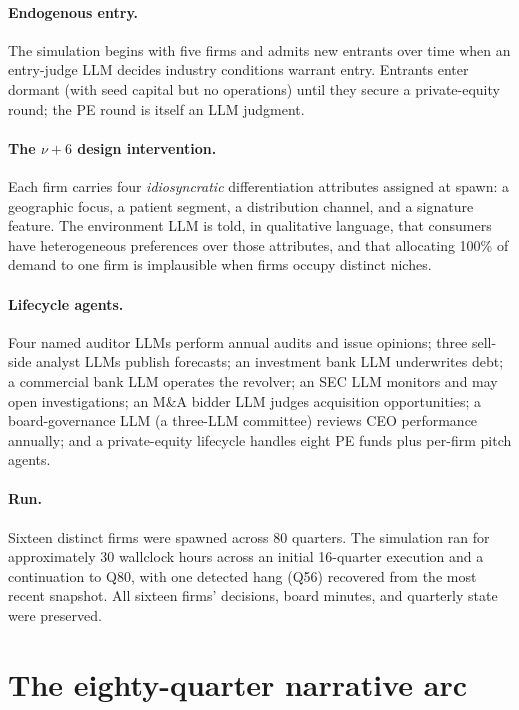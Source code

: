 \documentclass[11pt]{article}
\begin{document}
\paragraph{Endogenous entry.} The simulation begins with five firms and admits new entrants over time when an entry-judge LLM decides industry conditions warrant entry. Entrants enter dormant (with seed capital but no operations) until they secure a private-equity round; the PE round is itself an LLM judgment.

\paragraph{The $\nu+6$ design intervention.} Each firm carries four \emph{idiosyncratic} differentiation attributes assigned at spawn: a geographic focus, a patient segment, a distribution channel, and a signature feature. The environment LLM is told, in qualitative language, that consumers have heterogeneous preferences over those attributes, and that allocating 100\% of demand to one firm is implausible when firms occupy distinct niches.

\paragraph{Lifecycle agents.} Four named auditor LLMs perform annual audits and issue opinions; three sell-side analyst LLMs publish forecasts; an investment bank LLM underwrites debt; a commercial bank LLM operates the revolver; an SEC LLM monitors and may open investigations; an M\&A bidder LLM judges acquisition opportunities; a board-governance LLM (a three-LLM committee) reviews CEO performance annually; and a private-equity lifecycle handles eight PE funds plus per-firm pitch agents.

\paragraph{Run.} Sixteen distinct firms were spawned across 80 quarters. The simulation ran for approximately 30 wallclock hours across an initial 16-quarter execution and a continuation to Q80, with one detected hang (Q56) recovered from the most recent snapshot. All sixteen firms' decisions, board minutes, and quarterly state were preserved.

\section{The eighty-quarter narrative arc}\label{sec:narrative}
\end{document}
